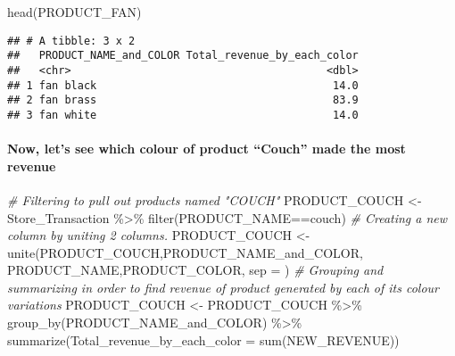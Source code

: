 \documentclass[
]{article}
\newenvironment{Shaded}{\begin{snugshade}}{\end{snugshade}}
\newcommand{\AttributeTok}[1]{\textcolor[rgb]{0.77,0.63,0.00}{#1}}
\newcommand{\CommentTok}[1]{\textcolor[rgb]{0.56,0.35,0.01}{\textit{#1}}}
\newcommand{\FunctionTok}[1]{\textcolor[rgb]{0.00,0.00,0.00}{#1}}
\newcommand{\NormalTok}[1]{#1}
\newcommand{\OtherTok}[1]{\textcolor[rgb]{0.56,0.35,0.01}{#1}}
\newcommand{\SpecialCharTok}[1]{\textcolor[rgb]{0.00,0.00,0.00}{#1}}
\newcommand{\StringTok}[1]{\textcolor[rgb]{0.31,0.60,0.02}{#1}}
\begin{document}
\begin{Shaded}
\begin{Highlighting}[]
\FunctionTok{head}\NormalTok{(PRODUCT\_FAN)}
\end{Highlighting}
\end{Shaded}

\begin{verbatim}
## # A tibble: 3 x 2
##   PRODUCT_NAME_and_COLOR Total_revenue_by_each_color
##   <chr>                                        <dbl>
## 1 fan black                                     14.0
## 2 fan brass                                     83.9
## 3 fan white                                     14.0
\end{verbatim}

\hypertarget{now-lets-see-which-colour-of-product-couch-made-the-most-revenue}{%
\paragraph{Now, let's see which colour of product ``Couch'' made the
most
revenue}\label{now-lets-see-which-colour-of-product-couch-made-the-most-revenue}}

\begin{Shaded}
\begin{Highlighting}[]
\CommentTok{\# Filtering to pull out products named "COUCH"}
\NormalTok{PRODUCT\_COUCH }\OtherTok{\textless{}{-}}\NormalTok{ Store\_Transaction }\SpecialCharTok{\%\textgreater{}\%} \FunctionTok{filter}\NormalTok{(PRODUCT\_NAME}\SpecialCharTok{==}\StringTok{\textquotesingle{}couch\textquotesingle{}}\NormalTok{)}
\CommentTok{\# Creating a new column by uniting 2 columns.}
\NormalTok{PRODUCT\_COUCH }\OtherTok{\textless{}{-}} \FunctionTok{unite}\NormalTok{(PRODUCT\_COUCH,}\StringTok{\textquotesingle{}PRODUCT\_NAME\_and\_COLOR\textquotesingle{}}\NormalTok{, PRODUCT\_NAME,PRODUCT\_COLOR, }\AttributeTok{sep =} \StringTok{\textquotesingle{} \textquotesingle{}}\NormalTok{)}
\CommentTok{\# Grouping and summarizing in order to find revenue of product generated by each of its colour variations}
\NormalTok{PRODUCT\_COUCH }\OtherTok{\textless{}{-}}\NormalTok{ PRODUCT\_COUCH }\SpecialCharTok{\%\textgreater{}\%} \FunctionTok{group\_by}\NormalTok{(PRODUCT\_NAME\_and\_COLOR) }\SpecialCharTok{\%\textgreater{}\%}
  \FunctionTok{summarize}\NormalTok{(}\AttributeTok{Total\_revenue\_by\_each\_color =} \FunctionTok{sum}\NormalTok{(NEW\_REVENUE))}
\end{Highlighting}
\end{Shaded}
\end{document}
